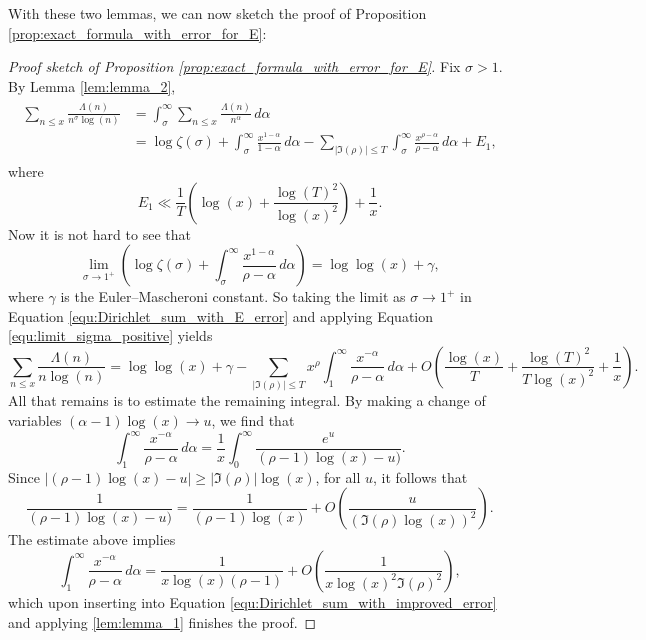 \documentclass[12pt,reqno]{amsart}
\theoremstyle{definition}
\numberwithin{equation}{section}
\begin{document}
    With these two lemmas, we can now sketch the proof of  Proposition \ref{prop:exact_formula_with_error_for_E}:

    \begin{proof}[Proof sketch of  Proposition \ref{prop:exact_formula_with_error_for_E}]
        Fix $\sigma > 1$. By Lemma \ref{lem:lemma_2},
        \begin{align}
        \begin{split}\label{equ:Dirichlet_sum_with_E_error}
            \sum_{n \le x}\frac{\Lambda(n)}{n^{\sigma}\log(n)} &= \int_{\sigma}^{\infty}\sum_{n \le x}\frac{\Lambda(n)}{n^{\alpha}}\,d\alpha \\
            &= \log\zeta(\sigma)+\int_{\sigma}^{\infty}\frac{x^{1-\alpha}}{1-\alpha}\,d\alpha-\sum_{|\Im(\rho)| \le T}\int_{\sigma}^{\infty}\frac{x^{\rho-\alpha}}{\rho-\alpha}\,d\alpha+E_{1},
        \end{split}
        \end{align}
        where
        \[
            E_{1} \ll \frac{1}{T}\left(\log(x)+\frac{\log(T)^{2}}{\log(x)^{2}}\right)+\frac{1}{x}.
        \]
        Now it is not hard to see that
        \begin{equation}\label{equ:limit_sigma_positive}
            \lim_{\sigma \to 1^{+}}\left(\log\zeta(\sigma)+\int_{\sigma}^{\infty}\frac{x^{1-\alpha}}{\rho-\alpha}\,d\alpha\right) = \log\log(x)+\gamma,
        \end{equation}
        where $\gamma$ is the Euler--Mascheroni constant. So taking the limit as $\sigma \to 1^{+}$ in Equation \ref{equ:Dirichlet_sum_with_E_error} and applying Equation \ref{equ:limit_sigma_positive} yields
        \begin{equation}\label{equ:Dirichlet_sum_with_improved_error}
            \sum_{n \le x}\frac{\Lambda(n)}{n\log(n)} = \log\log(x)+\gamma-\sum_{|\Im(\rho)| \le T}x^{\rho}\int_{1}^{\infty}\frac{x^{-\alpha}}{\rho-\alpha}\,d\alpha+O\left(\frac{\log(x)}{T}+\frac{\log(T)^{2}}{T\log(x)^{2}}+\frac{1}{x}\right).
        \end{equation}
        All that remains is to estimate the remaining integral. By making a change of variables $(\alpha-1)\log(x) \to u$, we find that
        \[
            \int_{1}^{\infty}\frac{x^{-\alpha}}{\rho-\alpha}\,d\alpha = \frac{1}{x}\int_{0}^{\infty}\frac{e^{u}}{(\rho-1)\log(x)-u)}.
        \]
        Since $|(\rho-1)\log(x)-u| \ge |\Im(\rho)|\log(x)$, for all $u$, it follows that
        \[
            \frac{1}{(\rho-1)\log(x)-u)} = \frac{1}{(\rho-1)\log(x)}+O\left(\frac{u}{(\Im(\rho)\log(x))^{2}}\right).
        \]
        The estimate above implies
        \[
            \int_{1}^{\infty}\frac{x^{-\alpha}}{\rho-\alpha}\,d\alpha = \frac{1}{x\log(x)(\rho-1)}+O\left(\frac{1}{x\log(x)^{2}\Im(\rho)^{2}}\right),
        \]
        which upon inserting into Equation \ref{equ:Dirichlet_sum_with_improved_error} and applying \ref{lem:lemma_1} finishes the proof.
    \end{proof}
\end{document}
